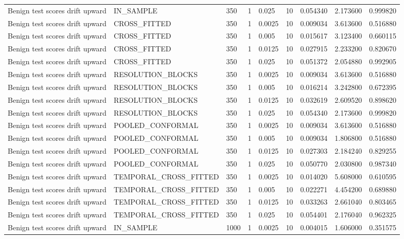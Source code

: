 \begin{tabular}{lllllllll}
Benign test scores drift upward & IN\_SAMPLE & 350 & 1 & 0.025 & 10 & 0.054340 & 2.173600 & 0.999820 \\
Benign test scores drift upward & CROSS\_FITTED & 350 & 1 & 0.0025 & 10 & 0.009034 & 3.613600 & 0.516880 \\
Benign test scores drift upward & CROSS\_FITTED & 350 & 1 & 0.005 & 10 & 0.015617 & 3.123400 & 0.660115 \\
Benign test scores drift upward & CROSS\_FITTED & 350 & 1 & 0.0125 & 10 & 0.027915 & 2.233200 & 0.820670 \\
Benign test scores drift upward & CROSS\_FITTED & 350 & 1 & 0.025 & 10 & 0.051372 & 2.054880 & 0.992905 \\
Benign test scores drift upward & RESOLUTION\_BLOCKS & 350 & 1 & 0.0025 & 10 & 0.009034 & 3.613600 & 0.516880 \\
Benign test scores drift upward & RESOLUTION\_BLOCKS & 350 & 1 & 0.005 & 10 & 0.016214 & 3.242800 & 0.672395 \\
Benign test scores drift upward & RESOLUTION\_BLOCKS & 350 & 1 & 0.0125 & 10 & 0.032619 & 2.609520 & 0.898620 \\
Benign test scores drift upward & RESOLUTION\_BLOCKS & 350 & 1 & 0.025 & 10 & 0.054340 & 2.173600 & 0.999820 \\
Benign test scores drift upward & POOLED\_CONFORMAL & 350 & 1 & 0.0025 & 10 & 0.009034 & 3.613600 & 0.516880 \\
Benign test scores drift upward & POOLED\_CONFORMAL & 350 & 1 & 0.005 & 10 & 0.009034 & 1.806800 & 0.516880 \\
Benign test scores drift upward & POOLED\_CONFORMAL & 350 & 1 & 0.0125 & 10 & 0.027303 & 2.184240 & 0.829255 \\
Benign test scores drift upward & POOLED\_CONFORMAL & 350 & 1 & 0.025 & 10 & 0.050770 & 2.030800 & 0.987340 \\
Benign test scores drift upward & TEMPORAL\_CROSS\_FITTED & 350 & 1 & 0.0025 & 10 & 0.014020 & 5.608000 & 0.610595 \\
Benign test scores drift upward & TEMPORAL\_CROSS\_FITTED & 350 & 1 & 0.005 & 10 & 0.022271 & 4.454200 & 0.689880 \\
Benign test scores drift upward & TEMPORAL\_CROSS\_FITTED & 350 & 1 & 0.0125 & 10 & 0.033263 & 2.661040 & 0.803465 \\
Benign test scores drift upward & TEMPORAL\_CROSS\_FITTED & 350 & 1 & 0.025 & 10 & 0.054401 & 2.176040 & 0.962325 \\
Benign test scores drift upward & IN\_SAMPLE & 1000 & 1 & 0.0025 & 10 & 0.004015 & 1.606000 & 0.351575 \\

\end{tabular}
